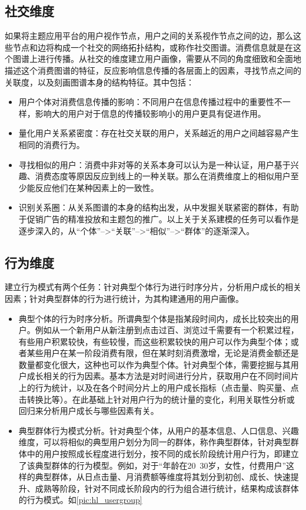         \subsection{社交维度}
        如果将主题应用平台的用户视作节点，用户之间的关系视作节点之间的边，那么这些节点和边将构成一个社交的网络拓扑结构，或称作社交图谱。消费信息就是在这个图谱上进行传播。从社交的维度建立用户画像，需要从不同的角度细致和全面地描述这个消费图谱的特征，反应影响信息传播的各层面上的因素，寻找节点之间的关联度，以及刻画图谱本身的结构特征。其中包括：
        \begin{itemize}
        \item 用户个体对消费信息传播的影响：不同用户在信息传播过程中的重要性不一样，影响大的用户对于信息的传播较影响小的用户更具有促进作用。
        \item 量化用户关系紧密度：存在社交关联的用户，关系越近的用户之间越容易产生相同的消费行为。
        \item 寻找相似的用户：消费中非对等的关系本身可以认为是一种认证，用户基于兴趣、消费态度等原因反应到线上的一种关联。那么在消费维度上的相似用户至少能反应他们在某种因素上的一致性。
        \item 识别关系圈：从关系图谱的本身的结构出发，从中发掘关联紧密的群体，有助于促销广告的精准投放和主题包的推广。以上关于关系建模的任务可以看作是逐步深入的，从“个体”-->“关联”-->“相似”-->“群体”的逐渐深入。
        \end{itemize}

        \subsection{行为维度}
        建立行为模式有两个任务：针对典型个体行为进行时序分片，分析用户成长的相关因素；针对典型群体的行为进行统计，为其构建通用的用户画像。
        \begin{itemize}
        \item 典型个体的行为时序分析。所谓典型个体是指某段时间内，成长比较突出的用户。例如从一个新用户从新注册到点击过百、浏览过千需要有一个积累过程，有些用户积累较快，有些较慢，而这些积累较快的用户可以作为典型个体；或者某些用户在某一阶段消费有限，但在某时刻消费激增，无论是消费金额还是数量都变化很大，这种也可以作为典型个体。针对典型个体，需要挖掘与其用户成长相关的行为因素。基本方法是对时间进行分片，获取用户在不同时间片上的行为统计，以及在各个时间分片上的用户成长指标（点击量、购买量、点击转换比等）。在此基础上针对用户行为的统计量的变化，利用关联性分析或回归来分析用户成长与哪些因素有关。
        \item 典型群体行为模式分析。针对典型个体，从用户的基本信息、人口信息、兴趣维度，可以将相似的典型用户划分为同一的群体，称作典型群体，针对典型群体中的用户按照成长程度进行划分，按不同的成长阶段统计用户行为，即建立了该典型群体的行为模型。例如，对于“年龄在20~30岁，女性，付费用户”这样的典型群体，从日点击量、月消费额等维度将其划分到初创、成长、快速提升、成熟等阶段，针对不同成长阶段内的行为组合进行统计，结果构成该群体的行为模式。如\autoref{pic:hl_usergroup}
        \end{itemize}

